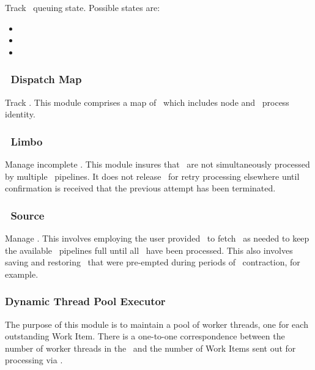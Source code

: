 \begin{itemize}
    Track \varWorkItem~queuing state.
    Possible states are:
    
    \begin{itemize} 
      \item \varPendingQueued
      \item \varPendingAssigned
      \item \varNotPending
    \end{itemize}    
    
    \subsubsection{\varCAS~Dispatch Map}
    
    Track \varWorkItems.
    This module comprises a map of \varWorkItems~which includes node and \varLinux~process identity.
    
    \subsubsection{\varCAS~Limbo}
    
    Manage incomplete \varWorkItems.
    This module insures that \varWorkItems~are not simultaneously processed
    by multiple \varUIMA~pipelines.
    It does not release \varWorkItems~for retry processing elsewhere until
    confirmation is received that the previous attempt has been terminated.
    
    \subsubsection{\varCAS~Source}
    
    Manage \varCASes. 
    This involves employing the user provided \varCR~to fetch
    \varCASes~as needed to keep the available \varUIMA~pipelines full
    until all \varCASes~have been processed.
    This also involves saving and restoring \varCASes~that were
    pre-empted during periods of \varJP~contraction, for example.
    
    \subsubsection{Dynamic Thread Pool Executor}
    
    The purpose of this module is to maintain a pool of worker threads,
    one for each outstanding Work Item.
    There is a one-to-one correspondence between the number of worker threads
    in the \varJobDriver~and the number of Work Items sent out for processing
    via \varSendAndReceiveCAS.
    

\end{itemize}
